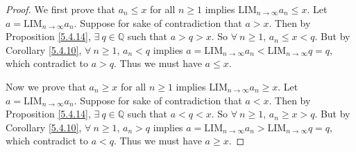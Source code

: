 \begin{proof}
We first prove that \(a_n \leq x\) for all \(n \geq 1\) implies \(\text{LIM}_{n \to \infty} a_n \leq x\).
Let \(a = \text{LIM}_{n \to \infty} a_n\).
Suppose for sake of contradiction that \(a > x\).
Then by Proposition \ref{5.4.14}, \(\exists\ q \in \mathds{Q}\) such that \(a > q > x\).
So \(\forall\ n \geq 1\), \(a_n \leq x < q\).
But by Corollary \ref{5.4.10}, \(\forall\ n \geq 1\), \(a_n < q\) implies \(a = \text{LIM}_{n \to \infty} a_n < \text{LIM}_{n \to \infty} q = q\), which contradict to \(a > q\).
Thus we must have \(a \leq x\).

Now we prove that \(a_n \geq x\) for all \(n \geq 1\) implies \(\text{LIM}_{n \to \infty} a_n \geq x\).
Let \(a = \text{LIM}_{n \to \infty} a_n\).
Suppose for sake of contradiction that \(a < x\).
Then by Proposition \ref{5.4.14}, \(\exists\ q \in \mathds{Q}\) such that \(a < q < x\).
So \(\forall\ n \geq 1\), \(a_n \geq x > q\).
But by Corollary \ref{5.4.10}, \(\forall\ n \geq 1\), \(a_n > q\) implies \(a = \text{LIM}_{n \to \infty} a_n > \text{LIM}_{n \to \infty} q = q\), which contradict to \(a < q\).
Thus we must have \(a \geq x\).
\end{proof}